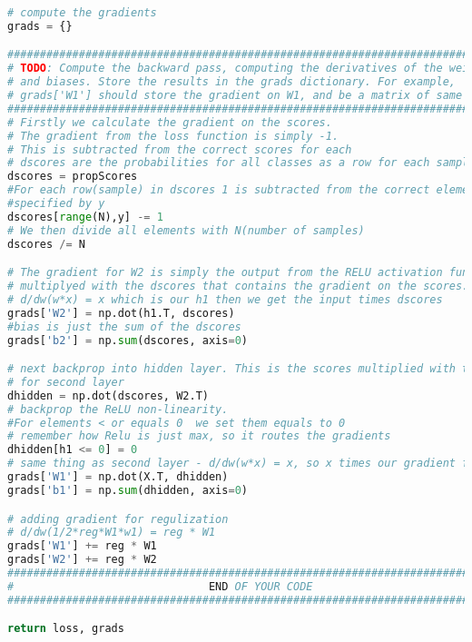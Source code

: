 \begin{lstlisting}[language=Python, label=lst:neuralnet.py, caption={neural\_net.py}, basicstyle=\tiny]
# compute the gradients
grads = {}

#############################################################################
# TODO: Compute the backward pass, computing the derivatives of the weights #
# and biases. Store the results in the grads dictionary. For example,       #
# grads['W1'] should store the gradient on W1, and be a matrix of same size #
#############################################################################
# Firstly we calculate the gradient on the scores.
# The gradient from the loss function is simply -1.
# This is subtracted from the correct scores for each
# dscores are the probabilities for all classes as a row for each sample
dscores = propScores
#For each row(sample) in dscores 1 is subtracted from the correct element 
#specified by y
dscores[range(N),y] -= 1
# We then divide all elements with N(number of samples)
dscores /= N

# The gradient for W2 is simply the output from the RELU activation function (h1)
# multiplyed with the dscores that contains the gradient on the scores.
# d/dw(w*x) = x which is our h1 then we get the input times dscores
grads['W2'] = np.dot(h1.T, dscores)
#bias is just the sum of the dscores
grads['b2'] = np.sum(dscores, axis=0)

# next backprop into hidden layer. This is the scores multiplied with the weights
# for second layer
dhidden = np.dot(dscores, W2.T)
# backprop the ReLU non-linearity. 
#For elements < or equals 0  we set them equals to 0
# remember how Relu is just max, so it routes the gradients
dhidden[h1 <= 0] = 0
# same thing as second layer - d/dw(w*x) = x, so x times our gradient for dhidden
grads['W1'] = np.dot(X.T, dhidden)
grads['b1'] = np.sum(dhidden, axis=0)

# adding gradient for regulization
# d/dw(1/2*reg*W1*w1) = reg * W1
grads['W1'] += reg * W1 
grads['W2'] += reg * W2
#############################################################################
#                              END OF YOUR CODE                             #
#############################################################################

return loss, grads
\end{lstlisting}










